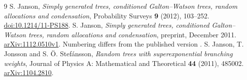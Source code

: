 \documentclass[11pt]{amsart}
\theoremstyle{remark}\newtheorem{remark}[theorem]{Remark}
\begin{document}
\begin{thebibliography}{9}
S. Janson,
\emph{Simply generated trees, conditioned Galton--Watson trees, random
allocations and condensation},
Probability Surveys \textbf{9} (2012), 103--252.
\href{https://doi.org/10.1214/11-PS188}{doi:10.1214/11-PS188}.
S. Janson,
\emph{Simply generated trees, conditioned Galton--Watson trees, random
allocations and condensation}, preprint, December 2011.
\href{https://arxiv.org/abs/1112.0510v1}{arXiv:1112.0510v1}.
Numbering differs from the published version \cite{Janson}.
S. Janson, T. Jonsson and S. \"O. Stef\'ansson,
\emph{Random trees with superexponential branching weights},
Journal of Physics A: Mathematical and Theoretical \textbf{44} (2011), 485002.
\href{https://arxiv.org/abs/1104.2810}{arXiv:1104.2810}.
\end{thebibliography}
\end{document}
